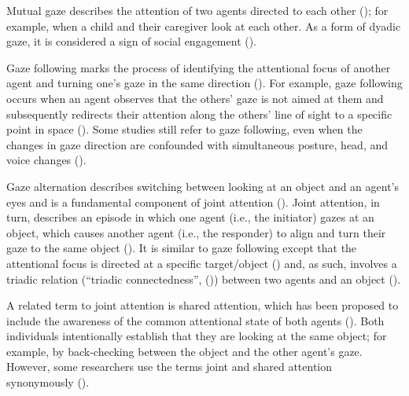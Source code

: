 \documentclass[
]{scrbook}
\begin{document}
Mutual gaze describes the attention of two agents directed to each other (); for example, when a child and their caregiver look at each other. As a form of dyadic gaze, it is considered a sign of social engagement ().

Gaze following marks the process of identifying the attentional focus of another agent and turning one's gaze in the same direction (). For example, gaze following occurs when an agent observes that the others' gaze is not aimed at them and subsequently redirects their attention along the others' line of sight to a specific point in space (). Some studies still refer to gaze following, even when the changes in gaze direction are confounded with simultaneous posture, head, and voice changes ().

Gaze alternation describes switching between looking at an object and an agent's eyes and is a fundamental component of joint attention (). Joint attention, in turn, describes an episode in which one agent (i.e., the initiator) gazes at an object, which causes another agent (i.e., the responder) to align and turn their gaze to the same object (). It is similar to gaze following except that the attentional focus is directed at a specific target/object () and, as such, involves a triadic relation (``triadic connectedness'', ()) between two agents and an object ().

A related term to joint attention is shared attention, which has been proposed to include the awareness of the common attentional state of both agents (). Both individuals intentionally establish that they are looking at the same object; for example, by back-checking between the object and the other agent's gaze. However, some researchers use the terms joint and shared attention synonymously ().
\end{document}
